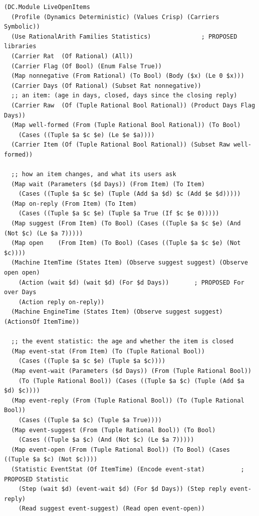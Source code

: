 \documentclass[11pt]{article}
\theoremstyle{definition}
\theoremstyle{plain}
\begin{document}
\begin{lstlisting}[style=mettamod]
(DC.Module LiveOpenItems
  (Profile (Dynamics Deterministic) (Values Crisp) (Carriers Symbolic))
  (Use RationalArith Families Statistics)              ; PROPOSED libraries
  (Carrier Rat  (Of Rational) (All))
  (Carrier Flag (Of Bool) (Enum False True))
  (Map nonnegative (From Rational) (To Bool) (Body ($x) (Le 0 $x)))
  (Carrier Days (Of Rational) (Subset Rat nonnegative))
  ;; an item: (age in days, closed, days since the closing reply)
  (Carrier Raw  (Of (Tuple Rational Bool Rational)) (Product Days Flag Days))
  (Map well-formed (From (Tuple Rational Bool Rational)) (To Bool)
    (Cases ((Tuple $a $c $e) (Le $e $a))))
  (Carrier Item (Of (Tuple Rational Bool Rational)) (Subset Raw well-formed))

  ;; how an item changes, and what its users ask
  (Map wait (Parameters ($d Days)) (From Item) (To Item)
    (Cases ((Tuple $a $c $e) (Tuple (Add $a $d) $c (Add $e $d)))))
  (Map on-reply (From Item) (To Item)
    (Cases ((Tuple $a $c $e) (Tuple $a True (If $c $e 0)))))
  (Map suggest (From Item) (To Bool) (Cases ((Tuple $a $c $e) (And (Not $c) (Le $a 7)))))
  (Map open    (From Item) (To Bool) (Cases ((Tuple $a $c $e) (Not $c))))
  (Machine ItemTime (States Item) (Observe suggest suggest) (Observe open open)
    (Action (wait $d) (wait $d) (For $d Days))       ; PROPOSED For over Days
    (Action reply on-reply))
  (Machine EngineTime (States Item) (Observe suggest suggest) (ActionsOf ItemTime))

  ;; the event statistic: the age and whether the item is closed
  (Map event-stat (From Item) (To (Tuple Rational Bool))
    (Cases ((Tuple $a $c $e) (Tuple $a $c))))
  (Map event-wait (Parameters ($d Days)) (From (Tuple Rational Bool))
    (To (Tuple Rational Bool)) (Cases ((Tuple $a $c) (Tuple (Add $a $d) $c))))
  (Map event-reply (From (Tuple Rational Bool)) (To (Tuple Rational Bool))
    (Cases ((Tuple $a $c) (Tuple $a True))))
  (Map event-suggest (From (Tuple Rational Bool)) (To Bool)
    (Cases ((Tuple $a $c) (And (Not $c) (Le $a 7)))))
  (Map event-open (From (Tuple Rational Bool)) (To Bool) (Cases ((Tuple $a $c) (Not $c))))
  (Statistic EventStat (Of ItemTime) (Encode event-stat)          ; PROPOSED Statistic
    (Step (wait $d) (event-wait $d) (For $d Days)) (Step reply event-reply)
    (Read suggest event-suggest) (Read open event-open))


\end{lstlisting}
\end{document}
